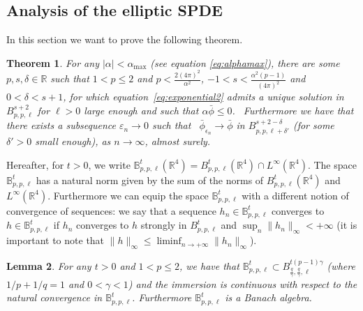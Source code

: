 \documentclass[a4paper,10pt]{article}
\newtheorem{theorem}{Theorem}
\newtheorem{lemma}[theorem]{Lemma}
\begin{document}
\subsection{Analysis of the elliptic SPDE}\label{subsection_analytic}

In this section we want to prove the following theorem.

\begin{theorem}
  \label{theorem_exponentialmain}For any $| \alpha | < \alpha_{\text{max}}$ (see equation \eqref{eq:alphamax}), there are some $p, s, \delta \in \mathbb{R}$ such that $1 < p
  \leqslant 2$ and $p < \frac{2 (4 \pi)^2}{\alpha^2}$, $- 1 < s <
  \frac{\alpha^2 (p - 1)}{(4 \pi)^2}$ and $0 < \delta < s + 1$, for which
  equation~{\eqref{eq:exponential2}} admits a unique solution in $B^{s +
  2}_{p, p, \ell}$ for $\ell > 0$ large enough and such that $\alpha
  \bar{\phi} \leqslant 0$. \ Furthermore we have that there exists a
  subsequence $\varepsilon_n \rightarrow 0$ such that \
  $\bar{\phi}_{\epsilon_n} \rightarrow \bar{\phi}$ in $B^{s + 2 - \delta}_{p,
  p, \ell + \delta'}$ (for some $\delta' > 0$ small enough), as $n \rightarrow
  \infty$, almost surely.
\end{theorem}

Hereafter, for $t > 0$, we write $\mathbb{B}^t_{p, p, \ell} (\mathbb{R}^4) =
B^t_{p, p, \ell} (\mathbb{R}^4) \cap L^{\infty} (\mathbb{R}^4)$. The space
$\mathbb{B}^t_{p, p, \ell}$ has a natural norm given by the sum of the norms
of $B^t_{p, p, \ell} (\mathbb{R}^4)$ and $L^{\infty} (\mathbb{R}^4)$.
Furthermore we can equip the space $\mathbb{B}^t_{p, p, \ell}$ with a
different notion of convergence of sequences: we say that a sequence $h_n \in
\mathbb{B}^t_{p, p, \ell}$ converges to $h \in \mathbb{B}^t_{p, p, \ell}$ if
$h_n$ converges to $h$ strongly in $B^t_{p, p, \ell}$ and $\sup_n \| h_n
\|_{\infty} < + \infty$ (it is important to note that $\| h \|_{\infty}
\leqslant \liminf_{n \rightarrow + \infty} \| h_n \|_{\infty}$).

\begin{lemma}
  \label{lemma_interpolation}For any $t > 0$ and $1 < p \leqslant 2$, we have
  that $\mathbb{B}^t_{p, p, \ell} \subset B^{t (p - 1)
  \gamma}_{\frac{q}{\gamma}, \frac{q}{\gamma}, \ell}$ (where $1 / p + 1 / q =
  1$ and $0 < \gamma<1$) and the immersion is continuous with respect to the
  natural convergence in $\mathbb{B}^t_{p, p, \ell}$. Furthermore
  $\mathbb{B}^t_{p, p, \ell}$ is a Banach algebra.
\end{lemma}
\end{document}
